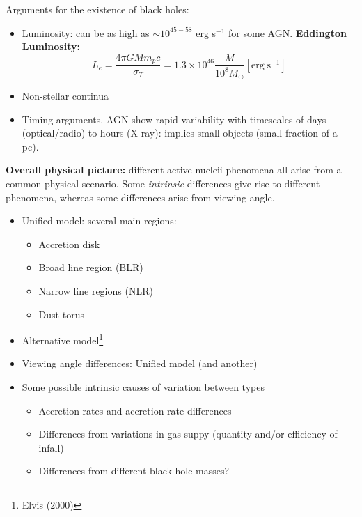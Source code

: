 \documentclass{article}
\begin{document}
Arguments for the existence of black holes:
\begin{itemize}
    \item Luminosity: can be as high as $\sim10^{45-58}$ erg s$^{-1}$
        for some AGN. \textbf{Eddington Luminosity:}
        \[
            L_{e} = \frac{4{\pi}GMm_{p}c}{\sigma_{T}} =
            1.3\times10^{46}\frac{M}{10^{8}M_{\odot}}
            \left[\mathrm{erg\;s}^{-1}\right]
        \]
    \item Non-stellar continua
    \item Timing arguments. AGN show rapid variability with timescales of
        days (optical/radio) to hours (X-ray): implies small objects
        (small fraction of a pc).
\end{itemize}
\textbf{Overall physical picture:}
different active nucleii phenomena all arise from
a common physical scenario. Some \emph{intrinsic} differences give rise
to different phenomena, whereas some differences arise from viewing angle.
\begin{itemize}
    \item Unified model: several main regions:
        \begin{itemize}
            \item Accretion disk
            \item Broad line region (BLR)
            \item Narrow line regions (NLR)
            \item Dust torus
        \end{itemize}
    \item Alternative model\footnote{Elvis (2000)}
    \item Viewing angle differences: Unified model (and another)
    \item Some possible intrinsic causes of variation between types
        \begin{itemize}
            \item Accretion rates and accretion rate differences
            \item Differences from variations in gas suppy (quantity and/or
                efficiency of infall)
            \item Differences from different black hole masses?
        \end{itemize}
\end{itemize}
\end{document}
